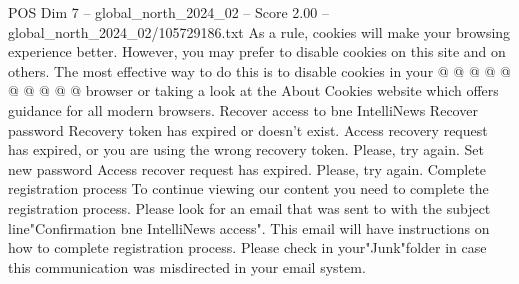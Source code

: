 \begin{textsample}{POS Dim 7 – global\_north\_2024\_02 – Score 2.00 – global\_north\_2024\_02/105729186.txt}
As a rule, cookies will make your browsing experience better.
However, you may prefer to disable cookies on this site and on others.
The most effective way to do this is to disable cookies in your @ @ @ @ @ @ @ @ @ @ browser or taking a look at the About Cookies website which offers guidance for all modern browsers.
Recover access to bne IntelliNews Recover password Recovery token has expired or doesn't exist.
Access recovery request has expired, or you are using the wrong recovery token.
Please, try again.
Set new password Access recover request has expired.
Please, try again.
Complete registration process To continue viewing our content you need to complete the registration process.
Please look for an email that was sent to with the subject line"Confirmation bne IntelliNews access".
This email will have instructions on how to complete registration process.
Please check in your"Junk"folder in case this communication was misdirected in your email system.

\end{textsample}
